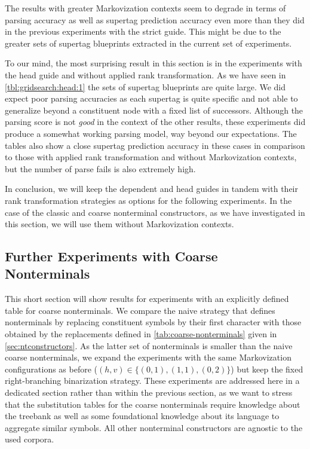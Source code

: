 \documentclass[../../document.tex]{subfiles}
\begin{document}
    The results with greater Markovization contexts seem to degrade in terms of parsing accuracy as well as supertag prediction accuracy even more than they did in the previous experiments with the strict guide.
    This might be due to the greater sets of supertag blueprints extracted in the current set of experiments.

    To our mind, the most surprising result in this section is in the experiments with the head guide and without applied rank transformation.
    As we have seen in \cref{tbl:gridsearch:head:1} the sets of supertag blueprints are quite large.
    We did expect poor parsing accuracies as each supertag is quite specific and not able to generalize beyond a constituent node with a fixed list of successors.
    Although the parsing score is not \emph{good} in the context of the other results, these experiments did produce a somewhat working parsing model, way beyond our expectations.
    The tables also show a close supertag prediction accuracy in these cases in comparison to those with applied rank transformation and without Markovization contexts, but the number of parse fails is also extremely high.

    In conclusion, we will keep the dependent and head guides in tandem with their rank transformation strategies as options for the following experiments.
    In the case of the classic and coarse nonterminal constructors, as we have investigated in this section, we will use them without Markovization contexts.

    \subsection{Further Experiments with Coarse Nonterminals}\label{sec:gridsearch:coarse}
    This short section will show results for experiments with an explicitly defined table for coarse nonterminals.
    We compare the naive strategy that defines nonterminals by replacing constituent symbols by their first character with those obtained by the replacements defined in \cref{tab:coarse-nonterminals} given in \cref{sec:ntconstructors}.
    As the latter set of nonterminals is smaller than the naive coarse nonterminals, we expand the experiments with the same Markovization configurations as before ($(h,v) \in \{(0,1), (1,1), (0,2)\}$) but keep the fixed right-branching binarization strategy.
    These experiments are addressed here in a dedicated section rather than within the previous section, as we want to stress that the substitution tables for the coarse nonterminals require knowledge about the treebank as well as some foundational knowledge about its language to aggregate similar symbols.
    All other nonterminal constructors are agnostic to the used corpora.
\end{document}
